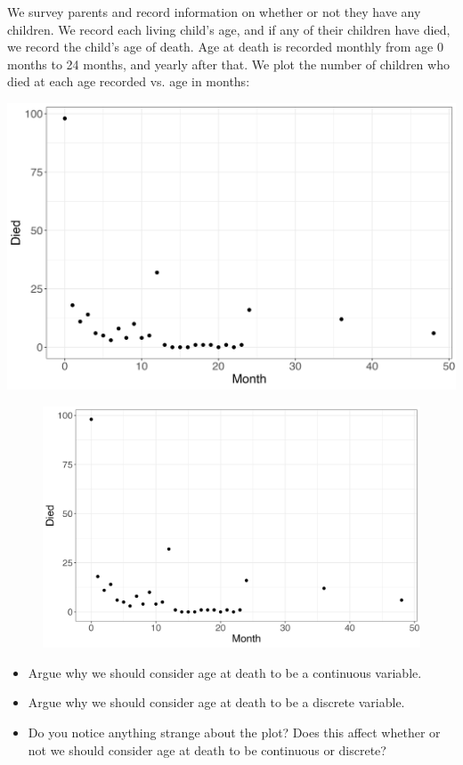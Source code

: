\documentclass[10pt,t]{beamer}
\begin{document}
\begin{frame}

We survey parents and record information on whether or not they have any children. We record each living child's age, and if any of their children have died, we record the child's age of death. Age at death is recorded monthly from age 0 months to 24 months, and yearly after that. We plot the number of children who died at each age recorded vs. age in months:

\vspace{0.3cm}

\centering \includegraphics[scale=0.3]{u5mr.png}
\end{frame}

\begin{frame}
\begin{figure}
	\centering \includegraphics[scale=0.3]{u5mr.png}
\end{figure}
	
\vspace{0.3cm}

\begin{itemize}
	\item Argue why we should consider age at death to be a continuous variable.
	\item Argue why we should consider age at death to be a discrete variable.
	\item Do you notice anything strange about the plot? Does this affect whether or not we should consider age at death to be continuous or discrete?
\end{itemize}

\end{frame}
\end{document}
